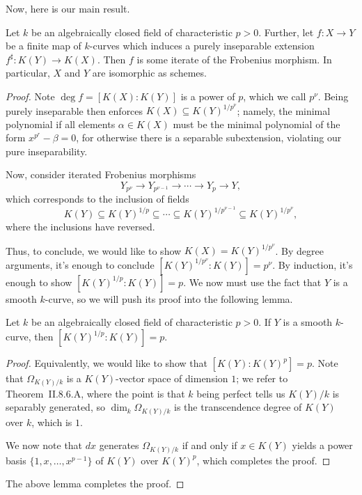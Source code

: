 \documentclass[../notes.tex]{subfiles}
\begin{document}
Now, here is our main result.
\begin{theorem}
	Let $k$ be an algebraically closed field of characteristic $p>0$. Further, let $f\colon X\to Y$ be a finite map of $k$-curves which induces a purely inseparable extension $f^\sharp\colon K(Y)\to K(X)$. Then $f$ is some iterate of the Frobenius morphism. In particular, $X$ and $Y$ are isomorphic as schemes.
\end{theorem}
\begin{proof}
	Note $\deg f=[K(X):K(Y)]$ is a power of $p$, which we call $p^\nu$. Being purely inseparable then enforces $K(X)\subseteq K(Y)^{1/p^\nu}$; namely, the minimal polynomial if all elements $\alpha\in K(X)$ must be the minimal polynomial of the form $x^{p^r}-\beta=0$, for otherwise there is a separable subextension, violating our pure inseparability.

	Now, consider iterated Frobenius morphisms
	\[Y_{p^\nu}\to Y_{p^{\nu-1}}\to\cdots\to Y_p\to Y,\]
	which corresponds to the inclusion of fields
	\[K(Y)\subseteq K(Y)^{1/p}\subseteq\cdots\subseteq K(Y)^{1/p^{\nu-1}}\subseteq K(Y)^{1/p^\nu},\]
	where the inclusions have reversed.
	
	Thus, to conclude, we would like to show $K(X)=K(Y)^{1/p^\nu}$. By degree arguments, it's enough to conclude $\left[K(Y)^{1/p^\nu}:K(Y)\right]=p^\nu$. By induction, it's enough to show $\left[K(Y)^{1/p}:K(Y)\right]=p$. We now must use the fact that $Y$ is a smooth $k$-curve, so we will push its proof into the following lemma.
	\begin{lemma}
		Let $k$ be an algebraically closed field of characteristic $p>0$. If $Y$ is a smooth $k$-curve, then $\left[K(Y)^{1/p}:K(Y)\right]=p$.
	\end{lemma}
	\begin{proof}
		Equivalently, we would like to show that $\left[K(Y):K(Y)^p\right]=p$. Note that $\Omega_{K(Y)/k}$ is a $K(Y)$-vector space of dimension $1$; we refer to Theorem~II.8.6.A, where the point is that $k$ being perfect tells us $K(Y)/k$ is separably generated, so $\dim_k\Omega_{K(Y)/k}$ is the transcendence degree of $K(Y)$ over $k$, which is $1$.

		We now note that $dx$ generates $\Omega_{K(Y)/k}$ if and only if $x\in K(Y)$ yields a power basis $\{1,x,\ldots,x^{p-1}\}$ of $K(Y)$ over $K(Y)^p$, which completes the proof.
	\end{proof}
	The above lemma completes the proof.
\end{proof}
\end{document}
